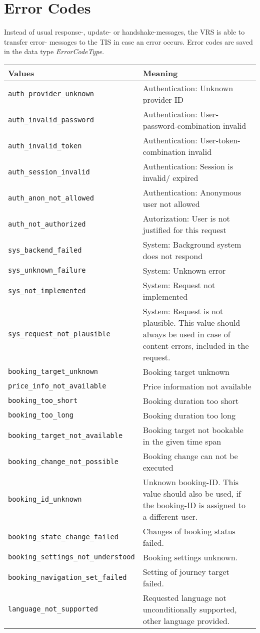\section{Error Codes}
\label{sec:CodeTabellen:ErrorCode}
Instead of usual response-, update- or handshake-messages, the VRS is able to transfer error- messages to the TIS in case an error occurs. Error codes are saved in the data type \emph{ErrorCodeType}.
\begin{flushleft}
\begin{tabularx}{\linewidth}{l>{\raggedright\arraybackslash}X}
\toprule
Values & Meaning\\
\midrule
\verb|auth_provider_unknown| & Authentication: Unknown provider-ID\\
\verb|auth_invalid_password| & Authentication: User-password-combination invalid\\
\verb|auth_invalid_token| & Authentication: User-token-combination invalid\\
\verb|auth_session_invalid| & Authentication: Session is invalid/ expired\\
\verb|auth_anon_not_allowed| & Authentication: Anonymous user not allowed\\
\verb|auth_not_authorized| & Autorization: User is not justified for this request\\
\verb|sys_backend_failed| & System: Background system does not respond\\
\verb|sys_unknown_failure| & System: Unknown error\\
\verb|sys_not_implemented| & System: Request not implemented\\
\verb|sys_request_not_plausible| & System: Request is not plausible. This value should always be used in case of content errors, included in the request.\\
\verb|booking_target_unknown| & Booking target unknown\\
\verb|price_info_not_available| & Price information not available\\
\verb|booking_too_short| & Booking duration too short\\
\verb|booking_too_long| & Booking duration too long\\
\verb|booking_target_not_available| & Booking target not bookable in the given time span\\
\verb|booking_change_not_possible| & Booking change can not be executed\\
\verb|booking_id_unknown| & Unknown booking-ID. This value should also be used, if the booking-ID is assigned to a different user.\\
\verb|booking_state_change_failed| & Changes of booking status failed.\\
\verb|booking_settings_not_understood| & Booking settings unknown.\\
\verb|booking_navigation_set_failed| & Setting of journey target failed.\\
\verb|language_not_supported| & Requested language not unconditionally supported, other language provided.\\
\bottomrule
\end{tabularx}
\end{flushleft}
